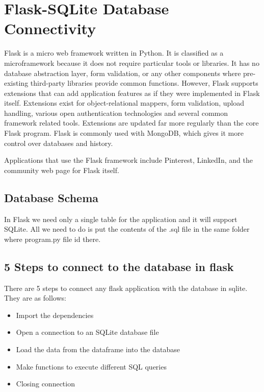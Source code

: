 \chapter{Flask-SQLite Database Connectivity}


Flask is a micro web framework written in Python. It is classified as a microframework because it does not require particular tools or libraries. It has no database abstraction layer, form validation, or any other components where pre-existing third-party libraries provide common functions. However, Flask supports extensions that can add application features as if they were implemented in Flask itself. Extensions exist for object-relational mappers, form validation, upload handling, various open authentication technologies and several common framework related tools. Extensions are updated far more regularly than the core Flask program. Flask is commonly used with MongoDB, which gives it more control over databases and history.

Applications that use the Flask framework include Pinterest, LinkedIn, and the community web page for Flask itself.\\
\section{Database Schema}
In Flask we need only a single table for the application and it will support SQLite. All we need to do is put the contents of the .sql file in the same folder where program.py file id there.
\\
\section{5 Steps to connect to the database in flask}
There are 5 steps to connect any flask application with the database in sqlite. They are as follows: 
\begin{itemize}
\item{Import the dependencies }
\item{Open a connection to an SQLite database file} 
\item{Load the data from the dataframe into the database} 
\item{Make functions to execute different SQL queries} 
\item{Closing connection}
\end{itemize}


